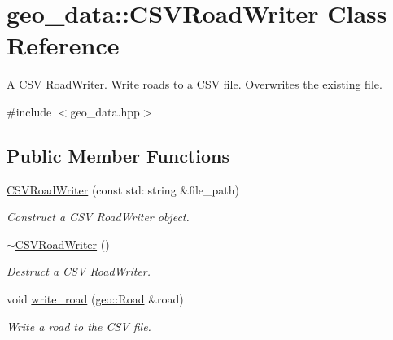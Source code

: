 \hypertarget{classgeo__data_1_1CSVRoadWriter}{}\section{geo\+\_\+data\+:\+:C\+S\+V\+Road\+Writer Class Reference}
\label{classgeo__data_1_1CSVRoadWriter}


A C\+SV Road\+Writer. Write roads to a C\+SV file. Overwrites the existing file.  




{\ttfamily \#include $<$geo\+\_\+data.\+hpp$>$}

\subsection*{Public Member Functions}
\begin{DoxyCompactItemize}
\item 
\hyperlink{classgeo__data_1_1CSVRoadWriter_aa36a5283c056925a9f3dd858a39233a2}{C\+S\+V\+Road\+Writer} (const std\+::string \&file\+\_\+path)
\begin{DoxyCompactList}\small\item\em Construct a C\+SV Road\+Writer object. \end{DoxyCompactList}\item 
\hyperlink{classgeo__data_1_1CSVRoadWriter_aa3805df6c1fe6448580af2b57490a87f}{$\sim$\+C\+S\+V\+Road\+Writer} ()\hypertarget{classgeo__data_1_1CSVRoadWriter_aa3805df6c1fe6448580af2b57490a87f}{}\label{classgeo__data_1_1CSVRoadWriter_aa3805df6c1fe6448580af2b57490a87f}

\begin{DoxyCompactList}\small\item\em Destruct a C\+SV Road\+Writer. \end{DoxyCompactList}\item 
void \hyperlink{classgeo__data_1_1CSVRoadWriter_a3b25f08452bd54c267ca53bc5abde1ec}{write\+\_\+road} (\hyperlink{classgeo_1_1Road}{geo\+::\+Road} \&road)\hypertarget{classgeo__data_1_1CSVRoadWriter_a3b25f08452bd54c267ca53bc5abde1ec}{}\label{classgeo__data_1_1CSVRoadWriter_a3b25f08452bd54c267ca53bc5abde1ec}

\begin{DoxyCompactList}\small\item\em Write a road to the C\+SV file. \end{DoxyCompactList}\end{DoxyCompactItemize}


